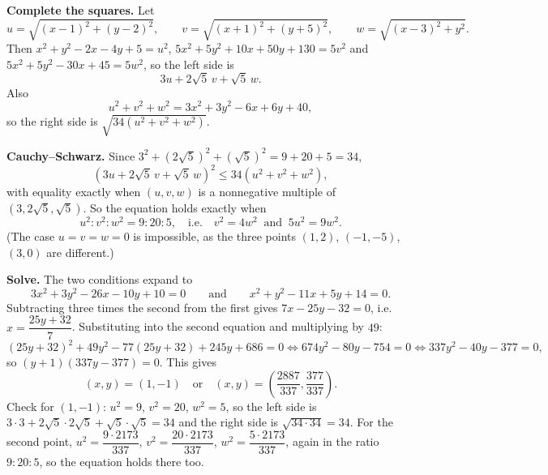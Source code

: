 \textbf{Complete the squares.} Let
\[
u=\sqrt{(x-1)^2+(y-2)^2},\qquad v=\sqrt{(x+1)^2+(y+5)^2},\qquad w=\sqrt{(x-3)^2+y^2}.
\]
Then $x^2+y^2-2x-4y+5=u^2$, $5x^2+5y^2+10x+50y+130=5v^2$ and $5x^2+5y^2-30x+45=5w^2$, so the left side is
\[
3u+2\sqrt5\,v+\sqrt5\,w .
\]
Also
\[
u^2+v^2+w^2=3x^2+3y^2-6x+6y+40,
\]
so the right side is $\sqrt{34\left(u^2+v^2+w^2\right)}$.

\textbf{Cauchy--Schwarz.} Since $3^2+(2\sqrt5)^2+(\sqrt5)^2=9+20+5=34$,
\[
\left(3u+2\sqrt5\,v+\sqrt5\,w\right)^2\le34\left(u^2+v^2+w^2\right),
\]
with equality exactly when $(u,v,w)$ is a nonnegative multiple of $(3,2\sqrt5,\sqrt5)$. So the equation holds exactly when
\[
u^2:v^2:w^2=9:20:5,\quad\text{i.e.}\quad v^2=4w^2\ \text{ and }\ 5u^2=9w^2 .
\]
(The case $u=v=w=0$ is impossible, as the three points $(1,2)$, $(-1,-5)$, $(3,0)$ are different.)

\textbf{Solve.} The two conditions expand to
\[
3x^2+3y^2-26x-10y+10=0\qquad\text{and}\qquad x^2+y^2-11x+5y+14=0 .
\]
Subtracting three times the second from the first gives $7x-25y-32=0$, i.e.\ $x=\dfrac{25y+32}{7}$. Substituting into the second equation and multiplying by $49$:
\[
(25y+32)^2+49y^2-77(25y+32)+245y+686=0\iff674y^2-80y-754=0\iff337y^2-40y-377=0 ,
\]
so $(y+1)(337y-377)=0$. This gives
\[
\boxed{(x,y)=(1,-1)\quad\text{or}\quad(x,y)=\left(\dfrac{2887}{337},\dfrac{377}{337}\right)}.
\]
Check for $(1,-1)$: $u^2=9$, $v^2=20$, $w^2=5$, so the left side is $3\cdot3+2\sqrt5\cdot2\sqrt5+\sqrt5\cdot\sqrt5=34$ and the right side is $\sqrt{34\cdot34}=34$. For the second point, $u^2=\dfrac{9\cdot2173}{337}$, $v^2=\dfrac{20\cdot2173}{337}$, $w^2=\dfrac{5\cdot2173}{337}$, again in the ratio $9:20:5$, so the equation holds there too.

